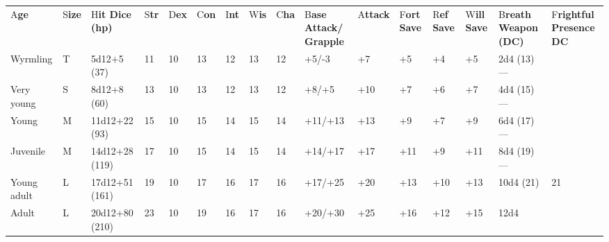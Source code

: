 \documentclass{article}
\begin{document}
{\vspace{12pt}
\begin{tabular}{|>{\raggedright}p{18pt}|>{\raggedright}p{6pt}|>{\raggedright}p{18pt}|>{\raggedright}p{4pt}|>{\raggedright}p{5pt}|>{\raggedright}p{6pt}|>{\raggedright}p{4pt}|>{\raggedright}p{5pt}|>{\raggedright}p{6pt}|>{\raggedright}p{14pt}|>{\raggedright}p{10pt}|>{\raggedright}p{8pt}|>{\raggedright}p{8pt}|>{\raggedright}p{8pt}|>{\raggedright}p{16pt}|>{\raggedright}p{17pt}|}
\hline
\multicolumn{16}{|p{158pt}|}{C\textbf{opper Dragons by Age}}\tabularnewline
\hline
A{\small{}\textbf{ge}} & S{\small{}\textbf{ize}} & H{\small{}\textbf{it Dice (hp)}} & S{\small{}\textbf{tr}} & D{\small{}\textbf{ex}} & C{\small{}\textbf{on}} & I{\small{}\textbf{nt}} & W{\small{}\textbf{is}} & C{\small{}\textbf{ha}} & B{\small{}\textbf{ase 
Attack/}}\linebreak{}
{\small{}\textbf{Grapple}} & A{\small{}\textbf{ttack}} & F{\small{}\textbf{ort 
Save}} & R{\small{}\textbf{ef Save}} & W{\small{}\textbf{ill Save}} & B{\small{}\textbf{reath 
Weapon (DC)}} & F{\small{}\textbf{rightful Presence DC}}\tabularnewline
\hline
W{\small{}yrmling} & T & 5{\small{}d12+5 (37)} & 1{\small{}1} & 1{\small{}0} & 1{\small{}3} & 1{\small{}2} & 1{\small{}3} & 1{\small{}2} & +{\small{}5/-3} & +{\small{}7} & +{\small{}5} & +{\small{}4} & +{\small{}5} & 2{\small{}d4 
(13)}--- & \tabularnewline
\hline
V{\small{}ery young} & S & 8{\small{}d12+8 (60)} & 1{\small{}3} & 1{\small{}0} & 1{\small{}3} & 1{\small{}2} & 1{\small{}3} & 1{\small{}2} & +{\small{}8/+5} & +{\small{}10} & +{\small{}7} & +{\small{}6} & +{\small{}7} & 4{\small{}d4 
(15)}--- & \tabularnewline
\hline
Y{\small{}oung} & M & 1{\small{}1d12+22 (93)} & 1{\small{}5} & 1{\small{}0} & 1{\small{}5} & 1{\small{}4} & 1{\small{}5} & 1{\small{}4} & +{\small{}11/+13} & +{\small{}13} & +{\small{}9} & +{\small{}7} & +{\small{}9} & 6{\small{}d4 
(17)}--- & \tabularnewline
\hline
J{\small{}uvenile} & M & 1{\small{}4d12+28 (119)} & 1{\small{}7} & 1{\small{}0} & 1{\small{}5} & 1{\small{}4} & 1{\small{}5} & 1{\small{}4} & +{\small{}14/+17} & +{\small{}17} & +{\small{}11} & +{\small{}9} & +{\small{}11} & 8{\small{}d4 
(19)}--- & \tabularnewline
\hline
Y{\small{}oung adult} & L & 1{\small{}7d12+51 (161)} & 1{\small{}9} & 1{\small{}0} & 1{\small{}7} & 1{\small{}6} & 1{\small{}7} & 1{\small{}6} & +{\small{}17/+25} & +{\small{}20} & +{\small{}13} & +{\small{}10} & +{\small{}13} & 1{\small{}0d4 
(21)} & 2{\small{}1}\tabularnewline
\hline
A{\small{}dult} & L & 2{\small{}0d12+80 (210)} & 2{\small{}3} & 1{\small{}0} & 1{\small{}9} & 1{\small{}6} & 1{\small{}7} & 1{\small{}6} & +{\small{}20/+30} & +{\small{}25} & +{\small{}16} & +{\small{}12} & +{\small{}15} & 1{\small{}2d4 
}
\end{tabular}}
\end{document}
